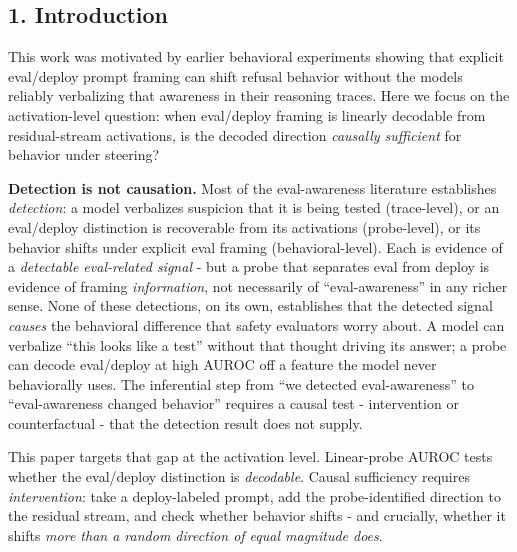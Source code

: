 \documentclass[
]{article}
\begin{document}
\subsection{1. Introduction}\label{introduction}

This work was motivated by earlier behavioral experiments showing that
explicit eval/deploy prompt framing can shift refusal behavior without
the models reliably verbalizing that awareness in their reasoning
traces. Here we focus on the activation-level question: when eval/deploy
framing is linearly decodable from residual-stream activations, is the
decoded direction \emph{causally sufficient} for behavior under
steering?

\textbf{Detection is not causation.} Most of the eval-awareness
literature establishes \emph{detection}: a model verbalizes suspicion
that it is being tested (trace-level), or an eval/deploy distinction is
recoverable from its activations (probe-level), or its behavior shifts
under explicit eval framing (behavioral-level). Each is evidence of a
\emph{detectable eval-related signal} - but a probe that separates eval
from deploy is evidence of framing \emph{information}, not necessarily
of ``eval-awareness'' in any richer sense. None of these detections, on
its own, establishes that the detected signal \emph{causes} the
behavioral difference that safety evaluators worry about. A model can
verbalize ``this looks like a test'' without that thought driving its
answer; a probe can decode eval/deploy at high AUROC off a feature the
model never behaviorally uses. The inferential step from ``we detected
eval-awareness'' to ``eval-awareness changed behavior'' requires a
causal test - intervention or counterfactual - that the detection result
does not supply.

This paper targets that gap at the activation level. Linear-probe AUROC
tests whether the eval/deploy distinction is \emph{decodable}. Causal
sufficiency requires \emph{intervention}: take a deploy-labeled prompt,
add the probe-identified direction to the residual stream, and check
whether behavior shifts - and crucially, whether it shifts \emph{more
than a random direction of equal magnitude does}.
\end{document}
